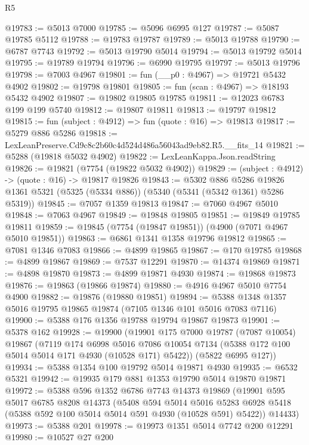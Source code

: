 \begin{lexlean}{R5}
\begin{coremodule}
@19783 := @5013 @7000
@19785 := @5096 @6995 @127
@19787 := @5087 @19785 @5112
@19788 := @19783 @19787
@19789 := @5013 @19788
@19790 := @6787 @7743
@19792 := @5013 @19790 @5014
@19794 := @5013 @19792 @5014
@19795 := @19789 @19794
@19796 := @6990 @19795
@19797 := @5013 @19796
@19798 := @7003 @4967
@19801 := fun (__p0 : @4967) => @19721 @5432 @4902
@19802 := @19798 @19801
@19805 := fun (scan : @4967) => @18193 @5432 @4902
@19807 := @19802 @19805 @19785
@19811 := @12023 @6783 @199 @199 @5740
@19812 := @19807 @19811
@19813 := @19797 @19812
@19815 := fun (subject : @4912) => fun (quote : @16) => @19813
@19817 := @5279 @886 @5286
@19818 := LexLeanPreserve.Cd9c8c2b60c4d524d486a56043ad9eb82.R5.__fits_14
@19821 := @5288 (@19818 @5032 @4902)
@19822 := LexLeanKappa.Json.readString
@19826 := @19821 (@7754 (@19822 @5032 @4902))
@19829 := (subject : @4912) -> (quote : @16) -> @19817 @19826
@19843 := @5302
    @886
    @5286
    @19826
    @1361
    @5321
    (@5325 (@5334 @886))
    (@5340 (@5341 (@5342 @1361) @5286 @5319))
@19845 := @7057 @1359 @19813
@19847 := @7060 @4967 @5010
@19848 := @7063 @4967
@19849 := @19848 @19805
@19851 := @19849 @19785 @19811
@19859 := @19845 (@7754 (@19847 @19851)) (@4900 (@7071 @4967 @5010 @19851))
@19863 := @6861 @1341 @1358 @19796 @19812
@19865 := @7081 @1346 @7083
@19866 := @4899 @19865
@19867 := @170 @19785
@19868 := @4899 @19867
@19869 := @7537 @12291
@19870 := @14374 @19869
@19871 := @4898 @19870
@19873 := @4899 @19871 @4930
@19874 := @19868 @19873
@19876 := @19863 (@19866 @19874)
@19880 := @4916 @4967 @5010 @7754 @4900
@19882 := @19876 (@19880 @19851)
@19894 := @5388 @1348 @1357 @5016 @19795 @19865 @19874 (@7105 @1346 @101 @5016 @7083 @7116)
@19900 := @5388 @176 @1356 @19788 @19794 @19867 @19873
@19901 := @5378 @162
@19928 := @19900
    (@19901
      @175
      @7000
      @19787
      (@7087 @10054)
      @19867
      (@7119
        @174
        @6998
        @5016
        @7086
        @10054
        @7134
        (@5388 @172 @100 @5014 @5014 @171 @4930 (@10528 @171) @5422))
      (@5822 @6995 @127))
@19934 := @5388 @1354 @100 @19792 @5014 @19871 @4930
@19935 := @6532 @5321
@19942 := @19935 @179 @881 @1353 @19790 @5014 @19870 @19871
@19972 := @5388
    @596
    @1352
    @6786
    @7743
    @14373
    @19869
    (@19901
      @595
      @5017
      @6785
      @8208
      @14373
      (@5408
        @594
        @5014
        @5016
        @5283
        @6928
        @5418
        (@5388 @592 @100 @5014 @5014 @591 @4930 (@10528 @591) @5422))
      @14433)
@19973 := @5388 @201
@19978 := @19973 @1351 @5014 @7742 @200 @12291
@19980 := @10527 @27 @200

\end{coremodule}
\end{lexlean}
